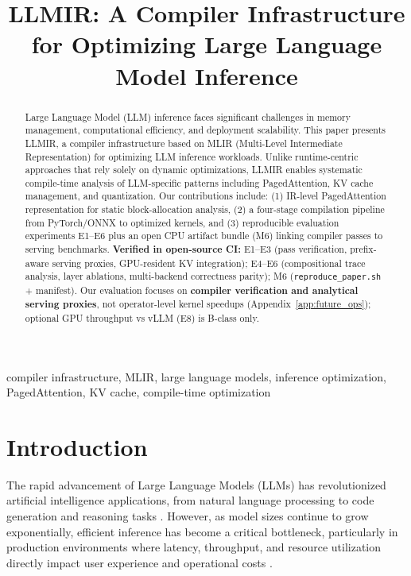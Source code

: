 \documentclass[conference]{IEEEtran}
\begin{document}
\title{LLMIR: A Compiler Infrastructure for Optimizing Large Language Model Inference}

\author{
}

\maketitle

\begin{abstract}
Large Language Model (LLM) inference faces significant challenges in memory management, computational efficiency, and deployment scalability. This paper presents LLMIR, a compiler infrastructure based on MLIR (Multi-Level Intermediate Representation) for optimizing LLM inference workloads. Unlike runtime-centric approaches that rely solely on dynamic optimizations, LLMIR enables systematic compile-time analysis of LLM-specific patterns including PagedAttention, KV cache management, and quantization. Our contributions include: (1) IR-level PagedAttention representation for static block-allocation analysis, (2) a four-stage compilation pipeline from PyTorch/ONNX to optimized kernels, and (3) reproducible evaluation experiments E1--E6 plus an open CPU artifact bundle (M6) linking compiler passes to serving benchmarks. \textbf{Verified in open-source CI:} E1--E3 (pass verification, prefix-aware serving proxies, GPU-resident KV integration); E4--E6 (compositional trace analysis, layer ablations, multi-backend correctness parity); M6 (\texttt{reproduce\_paper.sh} + manifest). Our evaluation focuses on \textbf{compiler verification and analytical serving proxies}, not operator-level kernel speedups (Appendix~\ref{app:future_ops}); optional GPU throughput vs vLLM (E8) is B-class only.
\end{abstract}

\begin{IEEEkeywords}
compiler infrastructure, MLIR, large language models, inference optimization, PagedAttention, KV cache, compile-time optimization
\end{IEEEkeywords}

\section{Introduction}

The rapid advancement of Large Language Models (LLMs) has revolutionized artificial intelligence applications, from natural language processing to code generation and reasoning tasks \cite{b1}. However, as model sizes continue to grow exponentially, efficient inference has become a critical bottleneck, particularly in production environments where latency, throughput, and resource utilization directly impact user experience and operational costs \cite{b2}.
\end{document}
